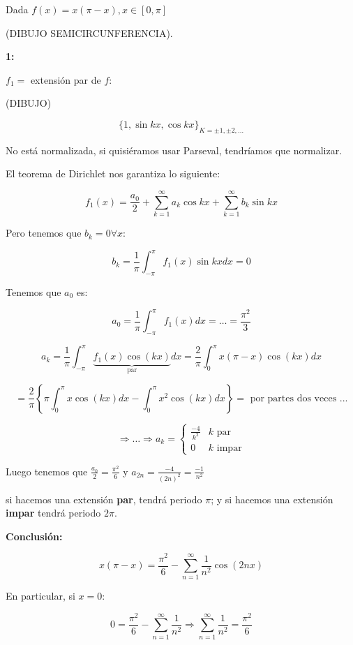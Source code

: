 	\begin{example}

		Dada $f(x) = x(\pi-x), x \in [0,\pi]$

		(DIBUJO SEMICIRCUNFERENCIA).

		\textbf{1:}

		$f_1 = $ extensión par de $f$:

		(DIBUJO)

		\[\{ 1, \sin{kx}, \cos{kx} \}_{K = ±1,±2,…} \]

		\obs No está normalizada, si quisiéramos usar Parseval, tendríamos que normalizar.

		El teorema de Dirichlet nos garantiza lo siguiente:

		\[
			f_1(x) = \frac{a_0}{2} + \sum_{k=1}^\infty a_k \cos{kx} + \sum_{k=1}^\infty b_k \sin kx
		\]

		Pero tenemos que $b_k = 0 \forall x$:

		\[b_k = \frac{1}{\pi} \int_{-\pi}^{\pi} f_1(x) \sin kx dx = 0 \]

		Tenemos que $a_0$ es:

		\[ a_0 = \frac{1}{\pi} \int_{-\pi}^{\pi} f_1(x) dx = … = \frac{\pi^2}{3} \]

		\[ a_k = \frac{1}{\pi} \int_{-\pi}^{\pi} \underbrace{f_1(x) \cos (kx)}_{\text{par}} dx = \frac{2}{\pi} \int_{0}^{\pi} x(\pi - x) \cos (kx) dx \]

		\[ = \frac{2}{\pi} \left\{ \pi \int_{0}^{\pi} x \cos(kx) dx  - \int_{0}^{π} x^2 \cos(kx) dx \right\} = \text{ por partes dos veces ...} \]

		\[ \Rightarrow … \Rightarrow a_k = \begin{cases}
			\frac{-4}{k^2} & k \text{ par} \\
			0 & k \text{ impar}
		\end{cases}  \]

		Luego tenemos que $\frac{a_0}{2} = \frac{\pi^2}{6}$ y $a_{2n} = \frac{-4}{(2n)^2} = \frac{-1}{n^2}$

		\obs si hacemos una extensión {\bf par}, tendrá periodo $\pi$; y si hacemos una extensión {\bf impar} tendrá periodo $2\pi$.

		{\bf Conclusión:}

		\[ x(\pi - x) = \frac{\pi^2}{6} -\sum_{n=1}^{\infty} \frac{1}{n^2} \cos(2n x) \]

		En particular, si $x=0$:

		\[ 0 = \frac{π^2}{6}  - \sum_{n=1}^\infty \frac{1}{n^2} \Rightarrow  \sum_{n=1}^\infty \frac{1}{n^2} = \frac{\pi^2}{6} \]


\end{example}
